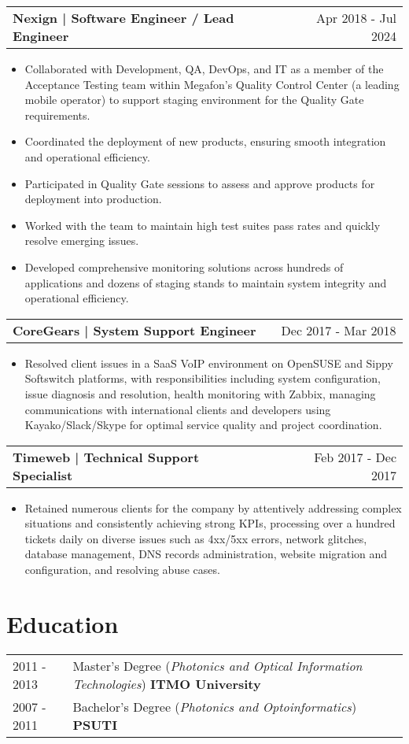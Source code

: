 \documentclass[a4paper,12pt]{article}
\makeatletter
\newenvironment{joblong}[2]
    {
    \begin{tabularx}{\linewidth}{@{}l X r@{}}
    \textbf{#1} & \hfill &  #2 \\[3.75pt]
    \end{tabularx}
    \begin{minipage}[t]{\linewidth}
    \begin{itemize}[nosep,after=\strut, leftmargin=1em, itemsep=3pt,label=--]
    }
    {
    \end{itemize}
    \end{minipage}    
    }
\makeatother
\begin{document}
\begin{joblong}{Nexign | Software Engineer / Lead Engineer}{Apr 2018 - Jul 2024}
\item Collaborated with Development, QA, DevOps, and IT as a member of the Acceptance Testing team within Megafon’s Quality Control Center (a leading mobile operator) to support staging environment for the Quality Gate requirements.
\item Coordinated the deployment of new products, ensuring smooth integration and operational efficiency.
\item Participated in Quality Gate sessions to assess and approve products for deployment into production.
\item Worked with the team to maintain high test suites pass rates and quickly resolve emerging issues.
\item Developed comprehensive monitoring solutions across hundreds of applications and dozens of staging stands to maintain system integrity and operational efficiency.
\end{joblong}

\begin{joblong}{CoreGears | System Support Engineer}{Dec 2017 - Mar 2018}
\item Resolved client issues in a SaaS VoIP environment on OpenSUSE and Sippy Softswitch platforms, with responsibilities including system configuration, issue diagnosis and resolution, health monitoring with Zabbix, managing communications with international clients and developers using Kayako/Slack/Skype for optimal service quality and project coordination.
\end{joblong}

\begin{joblong}{Timeweb | Technical Support Specialist}{Feb 2017 - Dec 2017}
\item Retained numerous clients for the company by attentively addressing complex situations and consistently achieving strong KPIs, processing over a hundred tickets daily on diverse issues such as 4xx/5xx errors, network glitches, database management, DNS records administration, website migration and configuration, and resolving abuse cases.
\end{joblong}

\section{Education}
\begin{tabularx}{\linewidth}{@{}l X@{}}	
2011 - 2013 & Master’s Degree (\textit{Photonics and Optical Information Technologies}) \hfill \textbf{ITMO University}  \\ 
2007 - 2011 & Bachelor's Degree (\textit{Photonics and Optoinformatics}) \hfill \textbf{PSUTI} \\ 
\end{tabularx}
\end{document}
